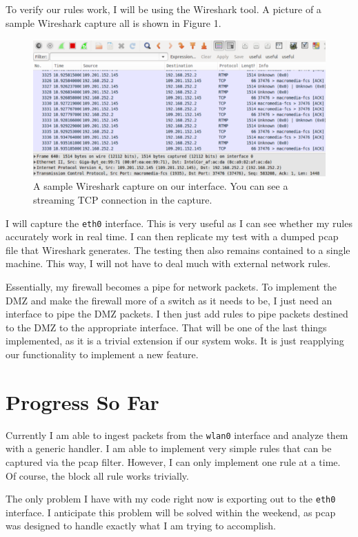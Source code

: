 \documentclass[12pt]{article}
\begin{document}
To verify our rules work, I will be using the Wireshark tool.
A picture of a sample Wireshark capture all is shown in Figure 1. \\
\begin{figure}[h]
	\includegraphics[scale=0.77]{wireshark.png}
	\caption{A sample Wireshark capture on our interface.
			 You can see a streaming TCP connection in the capture.}
\end{figure}
I will capture the \texttt{eth0} interface.
This is very useful as I can see whether my rules accurately work in real time.
I can then replicate my test with a dumped pcap file that Wireshark generates.
The testing then also remains contained to a single machine.
This way, I will not have to deal much with external network rules. \par

Essentially, my firewall becomes a pipe for network packets.
To implement the DMZ and make the firewall more of a switch as it needs to be,
I just need an interface to pipe the DMZ packets.
I then just add rules to pipe packets destined to the DMZ to the appropriate
interface.
That will be one of the last things implemented, as it is a trivial extension
if our system woks. 
It is just reapplying our functionality to implement a new feature.

\section{Progress So Far}

Currently I am able to ingest packets from the \texttt{wlan0} interface and
analyze them with a generic handler.
I am able to implement very simple rules that can be captured via the pcap
filter.
However, I can only implement one rule at a time.
Of course, the block all rule works trivially. \par

The only problem I have with my code right now is exporting out to the
\texttt{eth0} interface.
I anticipate this problem will be solved within the weekend,
as pcap was designed to handle exactly what I am trying to accomplish.
\end{document}
